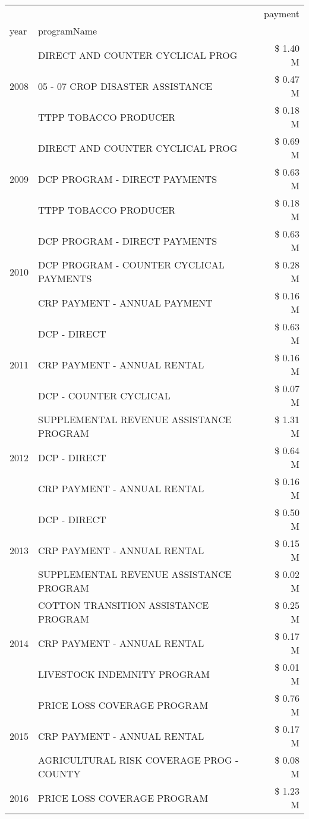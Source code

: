\begin{tabular}{llr}
\toprule
 &  & payment \\
year & programName &  \\
\midrule
\multirow[t]{3}{*}{2008} & DIRECT AND COUNTER CYCLICAL PROG & \$ 1.40 M \\
 & 05 - 07 CROP DISASTER ASSISTANCE & \$ 0.47 M \\
 & TTPP TOBACCO PRODUCER & \$ 0.18 M \\
\cline{1-3}
\multirow[t]{3}{*}{2009} & DIRECT AND COUNTER CYCLICAL PROG & \$ 0.69 M \\
 & DCP PROGRAM - DIRECT PAYMENTS & \$ 0.63 M \\
 & TTPP TOBACCO PRODUCER & \$ 0.18 M \\
\cline{1-3}
\multirow[t]{3}{*}{2010} & DCP PROGRAM - DIRECT PAYMENTS & \$ 0.63 M \\
 & DCP PROGRAM - COUNTER CYCLICAL PAYMENTS & \$ 0.28 M \\
 & CRP PAYMENT - ANNUAL PAYMENT & \$ 0.16 M \\
\cline{1-3}
\multirow[t]{3}{*}{2011} & DCP - DIRECT & \$ 0.63 M \\
 & CRP PAYMENT - ANNUAL RENTAL & \$ 0.16 M \\
 & DCP - COUNTER CYCLICAL & \$ 0.07 M \\
\cline{1-3}
\multirow[t]{3}{*}{2012} & SUPPLEMENTAL REVENUE ASSISTANCE PROGRAM & \$ 1.31 M \\
 & DCP - DIRECT & \$ 0.64 M \\
 & CRP PAYMENT - ANNUAL RENTAL & \$ 0.16 M \\
\cline{1-3}
\multirow[t]{3}{*}{2013} & DCP - DIRECT & \$ 0.50 M \\
 & CRP PAYMENT - ANNUAL RENTAL & \$ 0.15 M \\
 & SUPPLEMENTAL REVENUE ASSISTANCE PROGRAM & \$ 0.02 M \\
\cline{1-3}
\multirow[t]{3}{*}{2014} & COTTON TRANSITION ASSISTANCE PROGRAM & \$ 0.25 M \\
 & CRP PAYMENT - ANNUAL RENTAL & \$ 0.17 M \\
 & LIVESTOCK INDEMNITY PROGRAM & \$ 0.01 M \\
\cline{1-3}
\multirow[t]{3}{*}{2015} & PRICE LOSS COVERAGE PROGRAM & \$ 0.76 M \\
 & CRP PAYMENT - ANNUAL RENTAL & \$ 0.17 M \\
 & AGRICULTURAL RISK COVERAGE PROG - COUNTY & \$ 0.08 M \\
\cline{1-3}
\multirow[t]{3}{*}{2016} & PRICE LOSS COVERAGE PROGRAM & \$ 1.23 M \\

\end{tabular}
